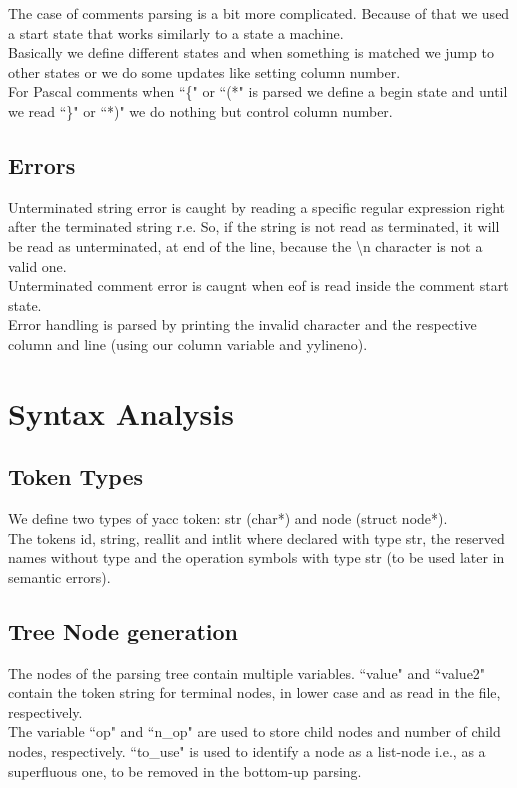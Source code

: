 \documentclass[12pt]{article}
\begin{document}
The case of comments parsing is a bit more complicated. Because of that we used a start state that works similarly to a state a machine.\\
Basically we define different states and when something is matched we jump to other states or we do some updates like setting column number.\\
For Pascal comments when ``\{" or ``(*" is parsed we define a begin state and until we read ``\}" or ``*)" we do nothing but control column number.\\

\subsection{Errors}

Unterminated string error is caught by reading a specific regular expression right after the terminated string r.e. So, if the string is not read as terminated, it will be read as unterminated, at end of the line, because the \textbackslash n character is not a valid one.\\
Unterminated comment error is caugnt when eof is read inside the comment start state.\\
Error handling is parsed by printing the invalid character and the respective column and line (using our column variable and yylineno).\\

\newpage

\section{Syntax Analysis}

\subsection{Token Types}

We define two types of yacc token: str (char*) and node (struct node*). \\
The tokens id, string, reallit and intlit where declared with type str, the reserved names without type and the operation symbols with type str (to be used later in semantic errors).\\

\subsection{Tree Node generation}

The nodes of the parsing tree contain multiple variables. ``value" and ``value2" contain the token string for terminal nodes, in lower case and as read in the file, respectively.\\
The variable ``op" and ``n\_op" are used to store child nodes and number of child nodes, respectively. ``to\_use" is used to identify a node as a list-node i.e., as a superfluous one, to be removed in the bottom-up parsing.\\
\end{document}
